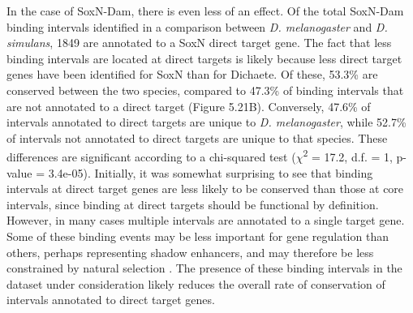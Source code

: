 In the case of SoxN-Dam, there is even less of an effect. Of the total SoxN-Dam binding intervals identified in a comparison between \emph{D. melanogaster} and \emph{D. simulans}, 1849 are annotated to a SoxN direct target gene. The fact that less binding intervals are located at direct targets is likely because less direct target genes have been identified for SoxN than for Dichaete. Of these, 53.3\% are conserved between the two species, compared to 47.3\% of binding intervals that are not annotated to a direct target (Figure 5.21B). Conversely, 47.6\% of intervals annotated to direct targets are unique to \emph{D. melanogaster}, while 52.7\% of intervals not annotated to direct targets are unique to that species. These differences are significant according to a chi-squared test (\(\chi\)\textsuperscript{2} = 17.2, d.f. = 1, p-value = 3.4e-05). Initially, it was somewhat surprising to see that binding intervals at direct target genes are less likely to be conserved than those at core intervals, since binding at direct targets should be functional by definition. However, in many cases multiple intervals are annotated to a single target gene. Some of these binding events may be less important for gene regulation than others, perhaps representing shadow enhancers, and may therefore be less constrained by natural selection \citep{ludwig_consequences_2011,perry_shadow_2010}. The presence of these binding intervals in the dataset under consideration likely reduces the overall rate of conservation of intervals annotated to direct target genes.

